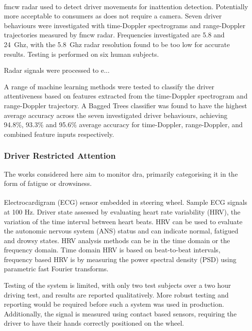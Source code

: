 \documentclass[11pt, parskip=half*,twoside=false]{scrbook}
\begin{document}
 \paragraph{\citet{dingInattentiveDrivingBehavior2019}} \gls{fmcw} radar used to detect driver movements for inattention detection. Potentially more acceptable to consumers as does not require a camera. Seven driver behaviours were investigated with time-Doppler spectrograms and range-Doppler trajectories measured by \gls{fmcw} radar. Frequencies investigated are 5.8 and 24~Ghz, with the 5.8~Ghz radar resolution found to be too low for accurate results. Testing is performed on six human subjects.
 
 Radar signals were processed to e...
 
 A range of machine learning methods were tested to classify the driver attentiveness based on features extracted from the time-Doppler spectrogram and range-Doppler trajectory. A Bagged Trees classifier was found to have the highest average accuracy across the seven investigated driver behaviours, achieving 94.8\%, 93.3\% and 95.6\% average accuracy for time-Doppler, range-Doppler, and combined feature inputs respectively. 
 
 
\subsubsection{Driver Restricted Attention}
The works considered here aim to monitor \gls{dra}, primarily categorising it in the form of fatigue or drowsiness.
 
 \paragraph{\citet{jungDriverFatigueDrowsiness2014}} Electrocardigram (ECG) sensor embedded in steering wheel. Sample ECG signals at 100 Hz. Driver state assessed by evaluating heart rate variability (HRV), the variation of the time interval between heart beats. HRV can be used to evaluate the autonomic nervous system (ANS) status and can indicate normal, fatigued and drowsy states. HRV analysis methods can be in the time domain or the frequency domain. Time domain HRV is based on beat-to-beat intervals, frequency based HRV is by measuring the power spectral density (PSD) using parametric fast Fourier transforms.
 
 Testing of the system is limited, with only two test subjects over a two hour driving test, and results are reported qualitatively. More robust testing and reporting would be required before such a system was used in production. Additionally, the signal is measured using contact based sensors, requiring the driver to have their hands correctly positioned on the wheel. 
 
\end{document}
